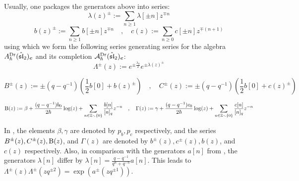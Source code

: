         Usually, one packages the generators above into series:
            $$\lambda(z)^{\pm} := \sum_{n \geq 1} \lambda[\pm n] z^{\mp n}$$
            $$
                b(z)^{\pm} := \sum_{n \geq 1} b[\pm n] z^{\mp n}
                \quad, \quad
                c(z) := \sum_{n \geq 0} c[\pm n] z^{\mp (n + 1)}
            $$
        using which we form the following series generating series for the algebra $A_{\hbar}^{\mathrm{Dr}}(\hat{\mathfrak{sl}}_2)_{\boldsymbol{c}}$ and its completion $\mathcal{A}_{\hbar}^{\mathrm{Dr}}(\hat{\mathfrak{sl}}_2)_{\boldsymbol{c}}$:
            \begin{equation} \label{equation: q_deformed_affine_sl_2_oscillator_Lambda_generating_series}
                \Lambda^{\pm}(z) := e^{ \pm \frac{\lambda_0}{2} } e^{ \pm \lambda(z)^{\pm} }
            \end{equation}
            
            \begin{equation} \label{equation: q_deformed_affine_sl_2_oscillator_BC_generating_series}
                B^{\pm}(z) := \pm (q - q^{-1}) \left( \frac12 b[0] + b(z)^{\pm} \right)
                \quad, \quad
                C^{\pm}(z) := \pm (q - q^{-1}) \left( \frac12 b[0] + c(z)^{\pm} \right)
            \end{equation}
            
            \begin{equation} \label{equation: quatum_affine_sl_2_oscillator_Theta_Gamma_generating_series}
                \mathrm{B}(z) := \beta + \frac{(q - q^{-1}) b_0}{2\hbar} \log(z) + \sum_{n \in \mathbb{Z} \smallsetminus \{0\}} \frac{b[n]}{[n]_q} z^{-n}
                \quad, \quad
                \Gamma(z) := \gamma + \frac{(q - q^{-1}) c_0}{2\hbar} \log(z) + \sum_{n \in \mathbb{Z} \smallsetminus \{0\}} \frac{c[n]}{[n]_q} z^{-n}
            \end{equation}
        \begin{remark}
            In \cite{frenkel_reshetikhin_affine_QUEs_and_deformed_virasoro_and_finite_W_algebras}, the elements $\beta, \gamma$ are denoted by $p_b, p_c$ respectively, and the series $B^{\pm}(z), C^{\pm}(z), \mathrm{B}(z)$, and $\Gamma(z)$ are denoted by $b^{\pm}(z), c^{\pm}(z), b(z)$, and $c(z)$ respectively. Also, in comparison with the generators $a[n]$ from \cite{awata_odake_shiraishi_free_boson_realisation_of_quantum_affine_sl_N}, the generators $\lambda[n]$ differ by $\lambda[n] = \frac{q - q^{-1}}{q^n + q^{-n}} a[n]$. This leads to $\Lambda^{\pm}(z) \Lambda^{\pm}(z q^{\pm 2}) = \exp\left( a^{\pm}( z q^{\pm 1} ) \right)$. 
        \end{remark}

